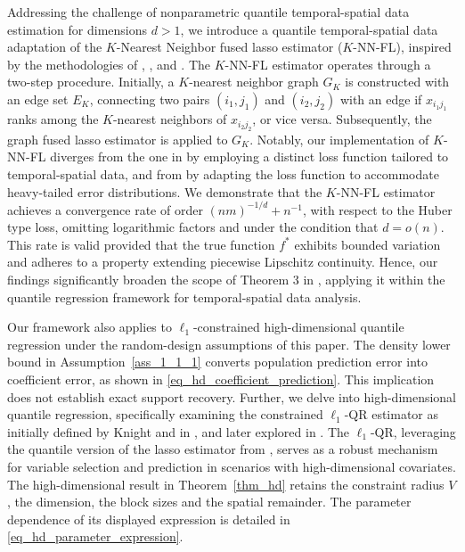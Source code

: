 \documentclass[twoside,11pt]{article}
\newcommand{\rev}[1]{{\color{revisionred}#1}}
\begin{document}
Addressing the challenge of nonparametric quantile temporal-spatial data estimation for dimensions \(d > 1\), we introduce a quantile temporal-spatial data adaptation of the \(K\)-Nearest Neighbor fused lasso estimator (\(K\)-NN-FL), inspired by the methodologies of \cite{elmoataz2008nonlocal}, \cite{ferradans2014regularized}, and \cite{madrid2022risk}. The \(K\)-NN-FL estimator operates through a two-step procedure. Initially, a \(K\)-nearest neighbor graph \(G_K\) is constructed with an edge set \(E_K\), connecting two pairs \( (i_1, j_1) \) and \( (i_2, j_2) \) with an edge if \( x_{i_1 j_1} \) ranks among the \(K\)-nearest neighbors of \( x_{i_2 j_2} \), or vice versa. Subsequently, the graph fused lasso estimator is applied to \(G_K\). Notably, our implementation of \(K\)-NN-FL diverges from the one in \cite{madrid2020adaptive} by employing a distinct loss function tailored to temporal-spatial data, and from \cite{padilla2023temporal} by adapting the loss function to accommodate heavy-tailed error distributions. We demonstrate that the \(K\)-NN-FL estimator achieves a convergence rate of order \((nm)^{-1/d} + n^{-1}\), with respect to the Huber type loss, omitting logarithmic factors and under the condition that \(d = o(n)\). This rate is valid provided that the true function \(f^*\) exhibits bounded variation and adheres to a property extending piecewise Lipschitz continuity. Hence, our findings significantly broaden the scope of Theorem 3 in \cite{padilla2023temporal}, applying it within the quantile regression framework for temporal-spatial data analysis.


\rev{Our framework also applies to $\ell_1$-constrained high-dimensional quantile regression under the random-design assumptions of this paper. The density lower bound in Assumption~\ref{ass_1_1_1} converts population prediction error into coefficient error, as shown in \eqref{eq_hd_coefficient_prediction}. This implication does not establish exact support recovery.} Further, we delve into high-dimensional quantile regression, specifically examining the constrained \(\ell_1\)-QR estimator as initially defined by Knight and in \cite{fu2000asymptotics}, and later explored in \cite{belloni2011}. The \(\ell_1\)-QR, leveraging the quantile version of the lasso estimator from \cite{tibshirani1996regression}, serves as a robust mechanism for variable selection and prediction in scenarios with high-dimensional covariates. \rev{The high-dimensional result in Theorem~\ref{thm_hd} retains the constraint radius $V$, the dimension, the block sizes and the spatial remainder. The parameter dependence of its displayed expression is detailed in \eqref{eq_hd_parameter_expression}.}
 
\end{document}
